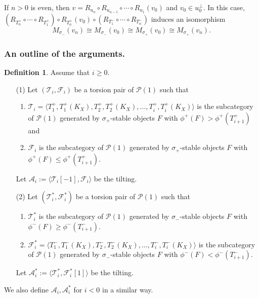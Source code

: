 \documentclass[leqno,11pt]{amsart}
\theoremstyle{definition}
\newtheorem{Def}[Thm]{Definition}
\def\AA{\ensuremath{\mathcal A}}
\def\FF{\ensuremath{\mathcal F}}
\def\PP{\ensuremath{\mathcal P}}
\def\TT{\ensuremath{\mathcal T}}
\begin{document}
If $n>0$ is even, then 
$v= R_{u_n} \circ R_{u_{n-1}} \circ \cdots \circ R_{u_1}(v_0)$ and
$v_0 \in u_0^\perp$.
In this case, 
$(R_{T_n^+}  \circ \cdots \circ  R_{T_{1}^+}) \circ R_{T_0^+}(v_0)
\circ (R_{T_1^-} \circ \cdots \circ R_{T_n^-})$ induces
an isomorphism
\begin{equation}
M_{\sigma_-}(v_{n}) \cong M_{\sigma_-}(v_0) \cong M_{\sigma_+}(v_0) 
\cong M_{\sigma_+}(v_{n}).
\end{equation}


\subsubsection{An outline of the arguments.}

\begin{Def}
Assume that $i  \geq 0$.
\begin{enumerate}
\item[(1)]
Let $(\TT_i,\FF_i)$ be a torsion pair of $\PP(1)$ such that
\begin{enumerate}
\item
$\TT_i=\langle T_1^+,T_1^+(K_X),T_2^+,T_2^+ (K_X),...,T_i^+,
T_i^+ (K_X) \rangle$ 
is the subcategory of $\PP(1)$ generated by $\sigma_+$-stable objects
$F$ with $\phi^+(F)>\phi^+(T_{i+1}^+)$ and
\item
$\FF_i$ is the subcategory of $\PP(1)$ generated by 
$\sigma_+$-stable objects $F$
with $\phi^+(F) \leq \phi^+(T_{i+1}^+)$.
\end{enumerate}
Let $\AA_i:=\langle \TT_i[-1],\FF_i \rangle$ be the tilting.
\item[(2)]
Let $(\TT_i^*,\FF_i^*)$ be a torsion pair of $\PP(1)$ such that
\begin{enumerate}
\item
$\TT_i^*$ is the subcategory of $\PP(1)$ generated by 
$\sigma_-$-stable objects $F$
with $\phi^-(F) \geq \phi^-(T_{i+1}^-)$.
\item
$\FF_i^*=\langle T_1^-,T_1^-(K_X),T_2^-,T_2^-(K_X),...,
T_i^-,T_i^-(K_X) \rangle$ 
is the subcategory of $\PP(1)$ generated by $\sigma_-$-stable objects
$F$ with $\phi^-(F)<\phi^-(T_{i+1}^-)$.
\end{enumerate}
Let $\AA_i^*:=\langle \TT_i^*,\FF_i^*[1] \rangle$ be the tilting.
\end{enumerate}
\end{Def}
We also define $\AA_i, \AA_i^*$ for $i <0$ in a similar way.


\end{document}
